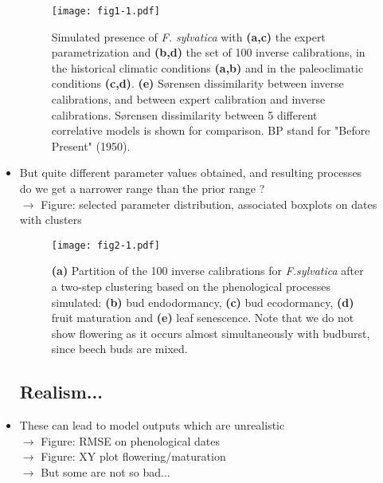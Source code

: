 \documentclass[letterpaper,8pt]{extarticle}  %
\begin{document}
\begin{doublespacing}
\begin{linenumbers}
\begin{itemize}
\begin{figure}[htpb]
\centering
\begin{subcaptiongroup}
\label{fig:1A} 
\label{fig:1B}
\label{fig:1C}
\label{fig:1D}
\label{fig:1E}
\end{subcaptiongroup}
\texttt{[image: fig1-1.pdf]}
\caption{Simulated presence of \emph{F. sylvatica} with \textbf{(a,c)} the expert parametrization and \textbf{(b,d)} the set of 100 inverse calibrations, in the historical climatic conditions \textbf{(a,b)} and in the paleoclimatic conditions \textbf{(c,d)}. \textbf{(e)} S\o rensen dissimilarity between inverse calibrations, and between expert calibration and inverse calibrations. S\o rensen dissimilarity between 5 different correlative models is shown for comparison. BP stand for "Before Present" (1950).}
\label{fig:1}
\end{figure}

\item But quite different parameter values obtained, and resulting processes\\
do we get a narrower range than the prior range ?\\
$\rightarrow$ Figure: selected parameter distribution, associated boxplots on dates with clusters

\begin{figure}[htpb]
\centering
\begin{subcaptiongroup}
\label{fig:2A} 
\label{fig:2B}
\label{fig:2C}
\label{fig:2D}
\label{fig:2E}
\end{subcaptiongroup}
\texttt{[image: fig2-1.pdf]}
\caption{\textbf{(a)} Partition of the 100 inverse calibrations for \emph{F.sylvatica} after a two-step clustering based on the phenological processes simulated: \textbf{(b)} bud endodormancy, \textbf{(c)} bud ecodormancy, \textbf{(d)} fruit maturation and \textbf{(e)} leaf senescence. Note that we do not show flowering as it occurs almost simultaneously with budburst, since beech buds are mixed.}
\label{fig:2}
\end{figure}

\subsection{Realism...}

\item These can lead to model outputs which are unrealistic \\
$\rightarrow$ Figure: RMSE on phenological dates \\
$\rightarrow$ Figure: XY plot flowering/maturation \\
$\rightarrow$ But some are not so bad...


\end{itemize}
\end{linenumbers}
\end{doublespacing}
\end{document}
